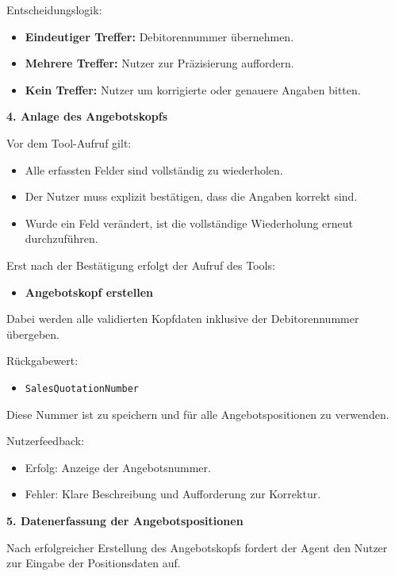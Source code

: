 Entscheidungslogik:

\begin{itemize}
    \item \textbf{Eindeutiger Treffer:} Debitorennummer übernehmen.
    \item \textbf{Mehrere Treffer:} Nutzer zur Präzisierung auffordern.
    \item \textbf{Kein Treffer:} Nutzer um korrigierte oder genauere Angaben bitten.
\end{itemize}

\textbf{4. Anlage des Angebotskopfs}

Vor dem Tool-Aufruf gilt:

\begin{itemize}
    \item Alle erfassten Felder sind vollständig zu wiederholen.
    \item Der Nutzer muss explizit bestätigen, dass die Angaben korrekt sind.
    \item Wurde ein Feld verändert, ist die vollständige Wiederholung erneut durchzuführen.
\end{itemize}

Erst nach der Bestätigung erfolgt der Aufruf des Tools:

\begin{itemize}
    \item \textbf{Angebotskopf erstellen}
\end{itemize}

Dabei werden alle validierten Kopfdaten inklusive der Debitorennummer übergeben.

Rückgabewert:
\begin{itemize}
    \item \texttt{SalesQuotationNumber}
\end{itemize}

Diese Nummer ist zu speichern und für alle Angebotspositionen zu verwenden.

Nutzerfeedback:
\begin{itemize}
    \item Erfolg: Anzeige der Angebotsnummer.
    \item Fehler: Klare Beschreibung und Aufforderung zur Korrektur.
\end{itemize}

\textbf{5. Datenerfassung der Angebotspositionen}

Nach erfolgreicher Erstellung des Angebotskopfs fordert der Agent den Nutzer zur Eingabe der Positionsdaten auf.

